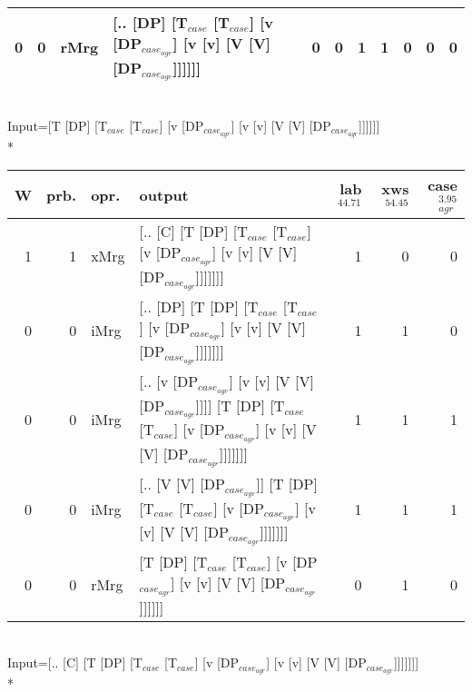 \begin{tabularx}{\linewidth}{rrlXrrrrrrr}
   0 &   0 & rMrg & [.. [DP] [T$_{case}$ [T$_{case}$] [v [DP$_{case_{agr}}$] [v [v] [V [V] [DP$_{case_{agr}}$]]]]]]                                                                        &            0 &              0 &             1 &             1 &                  0 &                0 &              0 \\
\hline
\end{tabularx}\endgroup\\
\begingroup\scriptsize Input=[T [DP] [T$_{case}$ [T$_{case}$] [v [DP$_{case_{agr}}$] [v [v] [V [V] [DP$_{case_{agr}}$]]]]]]\\*
\begin{tabularx}{\linewidth}{rrlXrrr}
\hline
   W &   prb. & opr.   & output                                                                                                                          &   lab$^{44.71}$ &   xws$^{54.45}$ &   case$_{agr}^{3.95}$ \\
\hline
   1 &   1 & xMrg & [.. [C] [T [DP] [T$_{case}$ [T$_{case}$] [v [DP$_{case_{agr}}$] [v [v] [V [V] [DP$_{case_{agr}}$]]]]]]]                                             &             1 &             0 &                  0 \\
   0 &   0 & iMrg & [.. [DP] [T [DP] [T$_{case}$ [T$_{case}$] [v [DP$_{case_{agr}}$] [v [v] [V [V] [DP$_{case_{agr}}$]]]]]]]                                            &             1 &             1 &                  0 \\
   0 &   0 & iMrg & [.. [v [DP$_{case_{agr}}$] [v [v] [V [V] [DP$_{case_{agr}}$]]]] [T [DP] [T$_{case}$ [T$_{case}$] [v [DP$_{case_{agr}}$] [v [v] [V [V] [DP$_{case_{agr}}$]]]]]]] &             1 &             1 &                  1 \\
   0 &   0 & iMrg & [.. [V [V] [DP$_{case_{agr}}$]] [T [DP] [T$_{case}$ [T$_{case}$] [v [DP$_{case_{agr}}$] [v [v] [V [V] [DP$_{case_{agr}}$]]]]]]]                           &             1 &             1 &                  1 \\
   0 &   0 & rMrg & [T [DP] [T$_{case}$ [T$_{case}$] [v [DP$_{case_{agr}}$] [v [v] [V [V] [DP$_{case_{agr}}$]]]]]]                                                      &             0 &             1 &                  0 \\
\hline
\end{tabularx}\endgroup\\
\begingroup\scriptsize Input=[.. [C] [T [DP] [T$_{case}$ [T$_{case}$] [v [DP$_{case_{agr}}$] [v [v] [V [V] [DP$_{case_{agr}}$]]]]]]]\\*
